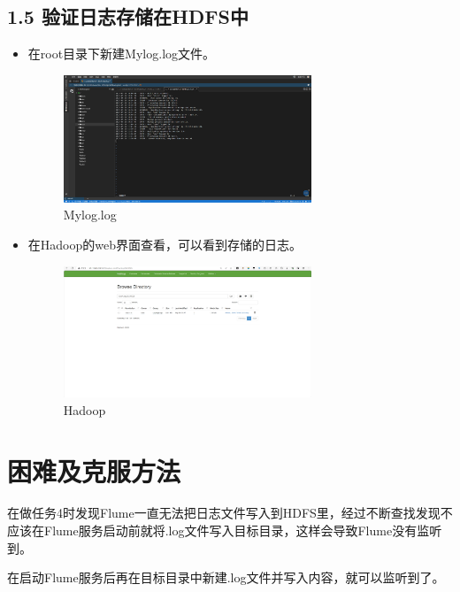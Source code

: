 \documentclass{article}
\begin{document}
\subsection*{1.5 验证日志存储在HDFS中}
\begin{itemize}
    \item 在root目录下新建Mylog.log文件。
    \begin{figure}[H]
        \centering
        \includegraphics[width=0.7\textwidth]{./pic/15.png}
        \caption{Mylog.log}
    \end{figure}
    \item 在Hadoop的web界面查看，可以看到存储的日志。
    \begin{figure}[H]
        \centering
        \includegraphics[width=0.7\textwidth]{./pic/17.png}
        \caption{Hadoop}
    \end{figure}
\end{itemize}

\section{困难及克服方法}
在做任务4时发现Flume一直无法把日志文件写入到HDFS里，经过不断查找发现不应该在Flume服务启动前就将.log文件写入目标目录，这样会导致Flume没有监听到。\par
在启动Flume服务后再在目标目录中新建.log文件并写入内容，就可以监听到了。
\end{document}
